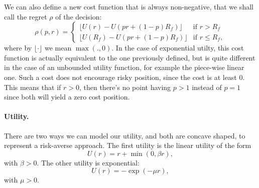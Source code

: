 We can also define a new cost function that is always non-negative, that we shall call the
regret $\rho$ of the decision:
\begin{equation}
  \rho(p,r) =
  \begin{cases}
    \lfloor U(r) - U(pr + (1-p)R_f)\rfloor & \text{if } r>R_f\\
    \lfloor U(R_f) - U(pr + (1-p)R_f)\rfloor &\text{if } r\leq R_f,
  \end{cases}
\end{equation}
where by $\lfloor \cdot \rfloor$ we mean $\max(.,0)$. In the case of exponential
utilty, this cost function is actually equivalent to the one previously defined, but is
quite different in the case of an unbounded utility function, for example the piece-wise
linear one. Such a cost does not encourage risky position, since the cost is at least
0. This means that if $r>0$, then there's no point having $p>1$ instead of $p=1$ since
both will yield a zero cost position. 

\paragraph{Utility.}
There are two ways we can model our utility, and both are concave shaped, to represent a
risk-averse approach. The first utility is the linear utility of the form
\begin{equation}
  U(r) = r + \min(0, \beta r),
\end{equation}
with $\beta > 0$. The other utility is exponential:
\begin{equation}
  U(r) = -\exp(-\mu r),
\end{equation}
with $\mu > 0$.

